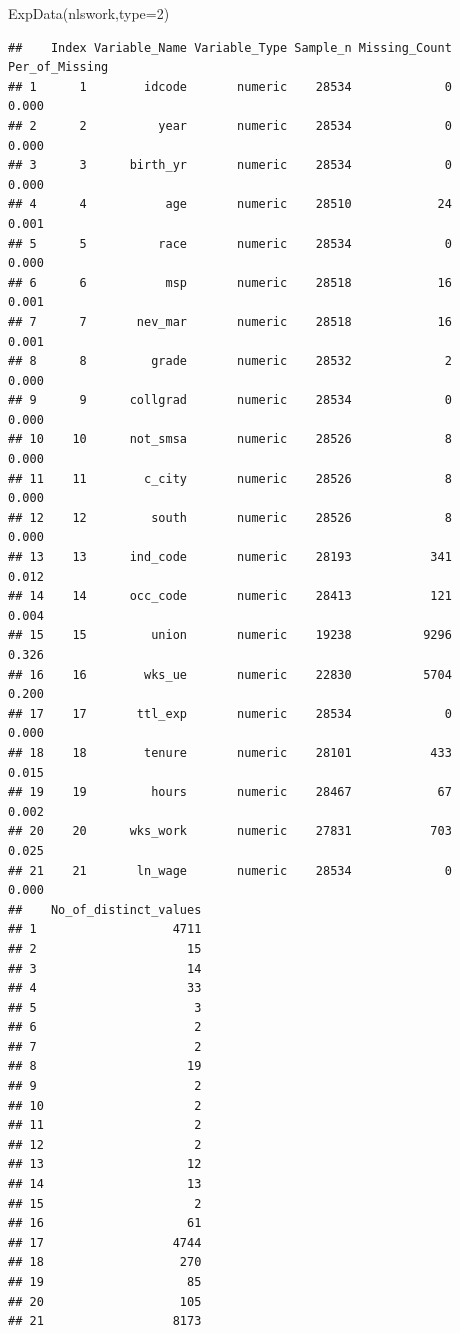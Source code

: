\documentclass[
]{article}
\newenvironment{Shaded}{\begin{snugshade}}{\end{snugshade}}
\newcommand{\AttributeTok}[1]{\textcolor[rgb]{0.77,0.63,0.00}{#1}}
\newcommand{\DecValTok}[1]{\textcolor[rgb]{0.00,0.00,0.81}{#1}}
\newcommand{\FunctionTok}[1]{\textcolor[rgb]{0.00,0.00,0.00}{#1}}
\newcommand{\NormalTok}[1]{#1}
\begin{document}
\begin{Shaded}
\begin{Highlighting}[]
  \FunctionTok{ExpData}\NormalTok{(nlswork,}\AttributeTok{type=}\DecValTok{2}\NormalTok{)}
\end{Highlighting}
\end{Shaded}

\begin{verbatim}
##    Index Variable_Name Variable_Type Sample_n Missing_Count Per_of_Missing
## 1      1        idcode       numeric    28534             0          0.000
## 2      2          year       numeric    28534             0          0.000
## 3      3      birth_yr       numeric    28534             0          0.000
## 4      4           age       numeric    28510            24          0.001
## 5      5          race       numeric    28534             0          0.000
## 6      6           msp       numeric    28518            16          0.001
## 7      7       nev_mar       numeric    28518            16          0.001
## 8      8         grade       numeric    28532             2          0.000
## 9      9      collgrad       numeric    28534             0          0.000
## 10    10      not_smsa       numeric    28526             8          0.000
## 11    11        c_city       numeric    28526             8          0.000
## 12    12         south       numeric    28526             8          0.000
## 13    13      ind_code       numeric    28193           341          0.012
## 14    14      occ_code       numeric    28413           121          0.004
## 15    15         union       numeric    19238          9296          0.326
## 16    16        wks_ue       numeric    22830          5704          0.200
## 17    17       ttl_exp       numeric    28534             0          0.000
## 18    18        tenure       numeric    28101           433          0.015
## 19    19         hours       numeric    28467            67          0.002
## 20    20      wks_work       numeric    27831           703          0.025
## 21    21       ln_wage       numeric    28534             0          0.000
##    No_of_distinct_values
## 1                   4711
## 2                     15
## 3                     14
## 4                     33
## 5                      3
## 6                      2
## 7                      2
## 8                     19
## 9                      2
## 10                     2
## 11                     2
## 12                     2
## 13                    12
## 14                    13
## 15                     2
## 16                    61
## 17                  4744
## 18                   270
## 19                    85
## 20                   105
## 21                  8173
\end{verbatim}
\end{document}
